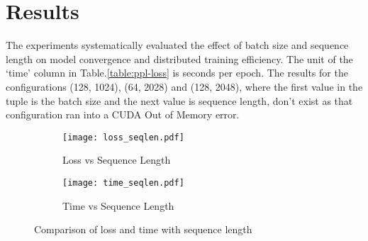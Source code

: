 \documentclass[conference]{IEEEtran}
\begin{document}
\section{Results}
The experiments systematically evaluated the effect of batch size and sequence length on model convergence and distributed training efficiency. The unit of the `time' column in Table.\ref{table:ppl-loss} is seconds per epoch.
The results for the configurations (128, 1024), (64, 2028) and (128, 2048), where the first value in the tuple is the batch size and the next value is sequence length, don't exist as that configuration ran into a CUDA Out of Memory error.
\begin{figure*}[!ht]
    \centering
    \begin{subfigure}[b]{0.9\textwidth}
        \centering
        \texttt{[image: loss\_seqlen.pdf]}
        \caption{Loss vs Sequence Length}
        \label{fig:loss_seqlen}
    \end{subfigure}

    \vspace{1em} %

    \begin{subfigure}[b]{0.9\textwidth}
        \centering
        \texttt{[image: time\_seqlen.pdf]}
        \caption{Time vs Sequence Length}
        \label{fig:time_seqlen}
    \end{subfigure}

    \caption{Comparison of loss and time with sequence length}
    \label{fig:seqlen_combined}
\end{figure*}
\end{document}
